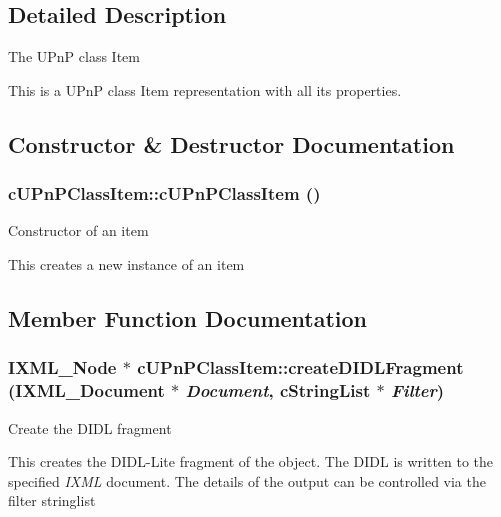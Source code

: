\subsection{Detailed Description}
The UPnP class Item

This is a UPnP class Item representation with all its properties. 

\subsection{Constructor \& Destructor Documentation}
\hypertarget{classcUPnPClassItem_c7d477be76ca83891c990441b539935d}{
\subsubsection[{cUPnPClassItem}]{\setlength{\rightskip}{0pt plus 5cm}cUPnPClassItem::cUPnPClassItem ()}}
\label{classcUPnPClassItem_c7d477be76ca83891c990441b539935d}


Constructor of an item

This creates a new instance of an item 

\subsection{Member Function Documentation}
\hypertarget{classcUPnPClassItem_5385975d79cd8e8b78429ecfe11b30a7}{
\subsubsection[{createDIDLFragment}]{\setlength{\rightskip}{0pt plus 5cm}IXML\_\-Node $\ast$ cUPnPClassItem::createDIDLFragment (IXML\_\-Document $\ast$ {\em Document}, \/  cStringList $\ast$ {\em Filter})}}
\label{classcUPnPClassItem_5385975d79cd8e8b78429ecfe11b30a7}


Create the DIDL fragment

This creates the DIDL-Lite fragment of the object. The DIDL is written to the specified {\em IXML\/} document. The details of the output can be controlled via the filter stringlist

